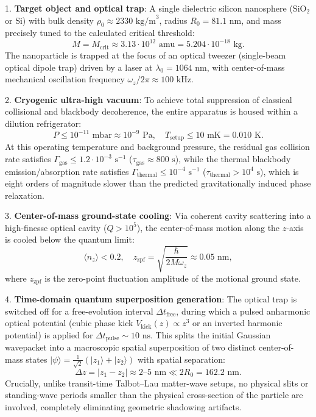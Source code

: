 1. \textbf{Target object and optical trap}: A single dielectric silicon nanosphere ($\text{SiO}_2$ or $\text{Si}$) with bulk density $\rho_0 \approx 2330\text{ kg/m}^3$, radius $R_0 = 81.1\text{ nm}$, and mass precisely tuned to the calculated critical threshold:
\begin{equation}\label{eq:5.46a}\tag{5.46a}
M = M_{\text{crit}} \approx 3.13 \cdot 10^{12}\text{ amu} = 5.204 \cdot 10^{-18}\text{ kg}.
\end{equation}
The nanoparticle is trapped at the focus of an optical tweezer (single-beam optical dipole trap) driven by a laser at $\lambda_0 = 1064\text{ nm}$, with center-of-mass mechanical oscillation frequency $\omega_z / 2\pi \approx 100\text{ kHz}$.

2. \textbf{Cryogenic ultra-high vacuum}: To achieve total suppression of classical collisional and blackbody decoherence, the entire apparatus is housed within a dilution refrigerator:
\begin{equation}\label{eq:5.46}\tag{5.46}
P \le 10^{-11}\text{ mbar} \approx 10^{-9}\text{ Pa}, \quad T_{\text{setup}} \le 10\text{ mK} = 0.010\text{ K}.
\end{equation}
At this operating temperature and background pressure, the residual gas collision rate satisfies $\Gamma_{\text{gas}} \le 1.2 \cdot 10^{-3}\text{ s}^{-1}$ ($\tau_{\text{gas}} \approx 800\text{ s}$), while the thermal blackbody emission/absorption rate satisfies $\Gamma_{\text{thermal}} \le 10^{-4}\text{ s}^{-1}$ ($\tau_{\text{thermal}} > 10^4\text{ s}$), which is eight orders of magnitude slower than the predicted gravitationally induced phase relaxation.

3. \textbf{Center-of-mass ground-state cooling}: Via coherent cavity scattering into a high-finesse optical cavity ($Q > 10^5$), the center-of-mass motion along the $z$-axis is cooled below the quantum limit:
\begin{equation}\label{eq:5.47}\tag{5.47}
\langle n_z \rangle < 0.2, \quad z_{\text{zpf}} = \sqrt{\frac{\hbar}{2 M \omega_z}} \approx 0.05\text{ nm},
\end{equation}
where $z_{\text{zpf}}$ is the zero-point fluctuation amplitude of the motional ground state.

4. \textbf{Time-domain quantum superposition generation}: The optical trap is switched off for a free-evolution interval $\Delta t_{\text{free}}$, during which a pulsed anharmonic optical potential (cubic phase kick $V_{\text{kick}}(z) \propto z^3$ or an inverted harmonic potential) is applied for $\Delta t_{\text{pulse}} \sim 10\text{ ns}$. This splits the initial Gaussian wavepacket into a macroscopic spatial superposition of two distinct center-of-mass states $|\psi\rangle = \frac{1}{\sqrt{2}}(|z_1\rangle + |z_2\rangle)$ with spatial separation:
\begin{equation}\label{eq:5.48}\tag{5.48}
\Delta z = |z_1 - z_2| \approx 2\text{--}5\text{ nm} \ll 2 R_0 = 162.2\text{ nm}.
\end{equation}
Crucially, unlike transit-time Talbot--Lau matter-wave setups, no physical slits or standing-wave periods smaller than the physical cross-section of the particle are involved, completely eliminating geometric shadowing artifacts.

